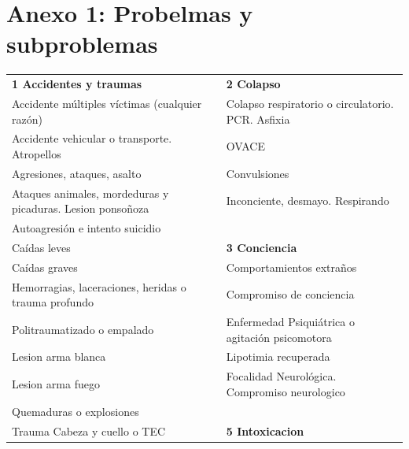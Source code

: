 \documentclass{article}
\begin{document}

\noindent\begin{minipage}{\linewidth}

\section{Anexo 1: Probelmas y subproblemas}
\begin{table}[H]
\centering
\begin{tabular}{ll}
\textbf{1 Accidentes y traumas}                            & \textbf{2 Colapso}                                \\
Accidente múltiples víctimas (cualquier razón)             & Colapso respiratorio o circulatorio. PCR. Asfixia \\
Accidente vehicular o transporte. Atropellos               & OVACE                                             \\
Agresiones, ataques, asalto                                & Convulsiones                                      \\
Ataques animales, mordeduras y picaduras. Lesion ponsoñoza & Inconciente, desmayo. Respirando                  \\
Autoagresión e intento suicidio                            &                                                   \\
Caídas leves                                               & \textbf{3 Conciencia}                             \\
Caídas graves                                              & Comportamientos extraños                          \\
Hemorragias, laceraciones, heridas o trauma profundo       & Compromiso de conciencia                          \\
Politraumatizado o empalado                                & Enfermedad Psiquiátrica o agitación psicomotora   \\
Lesion arma blanca                                         & Lipotimia recuperada                              \\
Lesion arma fuego                                          & Focalidad Neurológica. Compromiso neurologico     \\
Quemaduras o explosiones                                   &                                                   \\
Trauma Cabeza y cuello o TEC                               & \textbf{5 Intoxicacion}                           \\

\end{tabular}
\end{table}
\end{minipage}
\end{document}
